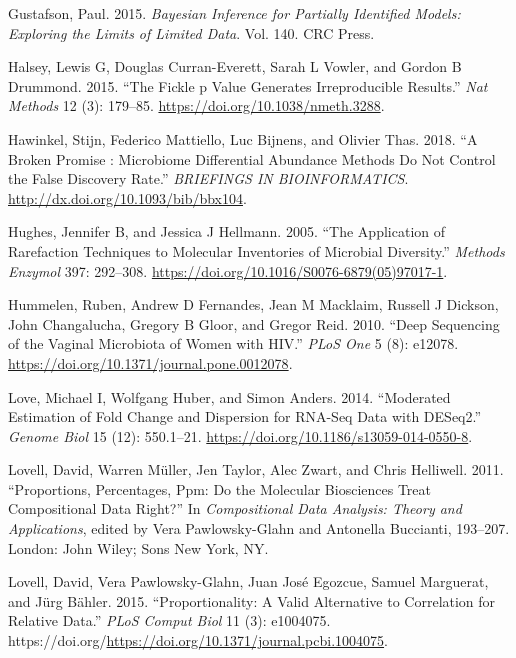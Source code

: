 \documentclass[
]{article}
\newlength{\cslhangindent}
\newlength{\cslentryspacingunit} %
\newenvironment{CSLReferences}[2] %
 {%
  \setlength{\parindent}{0pt}
  \ifodd #1
  \let\oldpar\par
  \def\par{\hangindent=\cslhangindent\oldpar}
  \fi
  \setlength{\parskip}{#2\cslentryspacingunit}
 }%
 {}
\begin{document}
\begin{CSLReferences}{1}{0}
\leavevmode{}%
Gustafson, Paul. 2015. \emph{Bayesian Inference for Partially Identified
Models: Exploring the Limits of Limited Data}. Vol. 140. CRC Press.

\leavevmode{}%
Halsey, Lewis G, Douglas Curran-Everett, Sarah L Vowler, and Gordon B
Drummond. 2015. {``The Fickle p Value Generates Irreproducible
Results.''} \emph{Nat Methods} 12 (3): 179--85.
\url{https://doi.org/10.1038/nmeth.3288}.

\leavevmode{}%
Hawinkel, Stijn, Federico Mattiello, Luc Bijnens, and Olivier Thas.
2018. {``A Broken Promise : Microbiome Differential Abundance Methods Do
Not Control the False Discovery Rate.''} \emph{BRIEFINGS IN
BIOINFORMATICS}. \url{http://dx.doi.org/10.1093/bib/bbx104}.

\leavevmode{}%
Hughes, Jennifer B, and Jessica J Hellmann. 2005. {``The Application of
Rarefaction Techniques to Molecular Inventories of Microbial
Diversity.''} \emph{Methods Enzymol} 397: 292--308.
\url{https://doi.org/10.1016/S0076-6879(05)97017-1}.

\leavevmode{}%
Hummelen, Ruben, Andrew D Fernandes, Jean M Macklaim, Russell J Dickson,
John Changalucha, Gregory B Gloor, and Gregor Reid. 2010. {``Deep
Sequencing of the Vaginal Microbiota of Women with {HIV}.''} \emph{PLoS
One} 5 (8): e12078. \url{https://doi.org/10.1371/journal.pone.0012078}.

\leavevmode{}%
Love, Michael I, Wolfgang Huber, and Simon Anders. 2014. {``Moderated
Estimation of Fold Change and Dispersion for RNA-Seq Data with
DESeq2.''} \emph{Genome Biol} 15 (12): 550.1--21.
\url{https://doi.org/10.1186/s13059-014-0550-8}.

\leavevmode{}%
Lovell, David, Warren Müller, Jen Taylor, Alec Zwart, and Chris
Helliwell. 2011. {``Proportions, Percentages, Ppm: Do the Molecular
Biosciences Treat Compositional Data Right?''} In \emph{Compositional
Data Analysis: Theory and Applications}, edited by Vera Pawlowsky-Glahn
and Antonella Buccianti, 193--207. London: John Wiley; Sons New York,
NY.

\leavevmode{}%
Lovell, David, Vera Pawlowsky-Glahn, Juan José Egozcue, Samuel
Marguerat, and Jürg Bähler. 2015. {``Proportionality: A Valid
Alternative to Correlation for Relative Data.''} \emph{PLoS Comput Biol}
11 (3): e1004075.
https://doi.org/\url{https://doi.org/10.1371/journal.pcbi.1004075}.


\end{CSLReferences}
\end{document}
